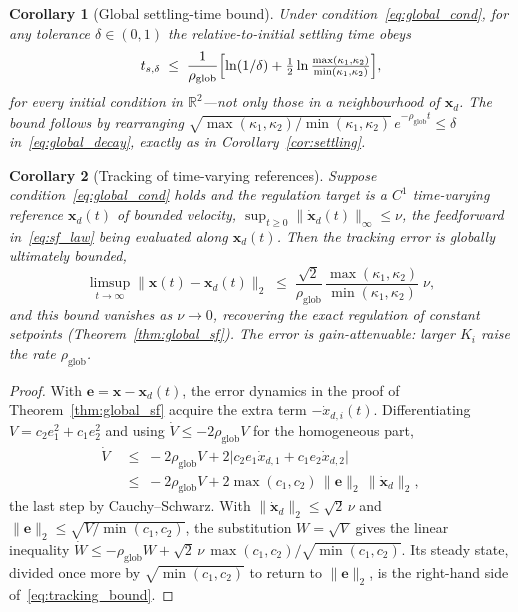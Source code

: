 \documentclass[12pt]{article}
\newtheorem{corollary}{Corollary}
\begin{document}
\begin{corollary}[Global settling-time bound]
\label{cor:global_settling}
Under condition~\eqref{eq:global_cond}, for any tolerance
$\delta\in(0,1)$ the relative-to-initial settling time obeys
\begin{equation}
t_{s,\delta}\;\le\;\frac{1}{\rho_{\mathrm{glob}}}
\Bigl[\ln(1/\delta)+\tfrac12\ln\tfrac{\max(\kappa_1,\kappa_2)}{\min(\kappa_1,\kappa_2)}\Bigr],
\end{equation}
for \emph{every} initial condition in $\mathbb{R}^2$---not only those in a
neighbourhood of $\mathbf{x}_d$. The bound follows by rearranging
$\sqrt{\max(\kappa_1,\kappa_2)/\min(\kappa_1,\kappa_2)}\,
e^{-\rho_{\mathrm{glob}}t}\le\delta$ in~\eqref{eq:global_decay}, exactly
as in Corollary~\ref{cor:settling}.
\end{corollary}

\begin{corollary}[Tracking of time-varying references]
\label{cor:tracking}
Suppose condition~\eqref{eq:global_cond} holds and the regulation target
is a $C^{1}$ time-varying reference $\mathbf{x}_d(t)$ of bounded velocity,
$\sup_{t\ge 0}\|\dot{\mathbf{x}}_d(t)\|_\infty\le\nu$, the
feedforward in~\eqref{eq:sf_law} being evaluated along
$\mathbf{x}_d(t)$. Then the tracking error is globally ultimately bounded,
\begin{equation}
\limsup_{t\to\infty}\|\mathbf{x}(t)-\mathbf{x}_d(t)\|_2
\;\le\;\frac{\sqrt{2}}{\rho_{\mathrm{glob}}}\,
       \frac{\max(\kappa_1,\kappa_2)}{\min(\kappa_1,\kappa_2)}\;\nu,
\label{eq:tracking_bound}
\end{equation}
and this bound vanishes as $\nu\to 0$, recovering the exact regulation of
constant setpoints (Theorem~\ref{thm:global_sf}). The error is
gain-attenuable: larger $K_i$ raise the rate $\rho_{\mathrm{glob}}$.
\end{corollary}

\begin{proof}
With $\mathbf{e}=\mathbf{x}-\mathbf{x}_d(t)$, the error dynamics in the
proof of Theorem~\ref{thm:global_sf} acquire the extra term
$-\dot x_{d,i}(t)$. Differentiating $V=c_2 e_1^2+c_1 e_2^2$ and using
$\dot V\le-2\rho_{\mathrm{glob}}V$ for the homogeneous part,
\begin{align*}
\dot V \;&\le\; -2\rho_{\mathrm{glob}}V
      + 2\bigl|c_2 e_1\dot x_{d,1}+c_1 e_2\dot x_{d,2}\bigr|\\
      \;&\le\; -2\rho_{\mathrm{glob}}V
      + 2\max(c_1,c_2)\,\|\mathbf{e}\|_2\,\|\dot{\mathbf{x}}_d\|_2,
\end{align*}
the last step by Cauchy--Schwarz. With
$\|\dot{\mathbf{x}}_d\|_2\le\sqrt2\,\nu$ and
$\|\mathbf{e}\|_2\le\sqrt{V/\min(c_1,c_2)}$, the substitution $W=\sqrt V$
gives the linear inequality $\dot W\le-\rho_{\mathrm{glob}}W
+\sqrt2\,\nu\,\max(c_1,c_2)/\sqrt{\min(c_1,c_2)}$. Its steady state,
divided once more by $\sqrt{\min(c_1,c_2)}$ to return to
$\|\mathbf{e}\|_2$, is the right-hand side of~\eqref{eq:tracking_bound}.
\end{proof}
\end{document}
